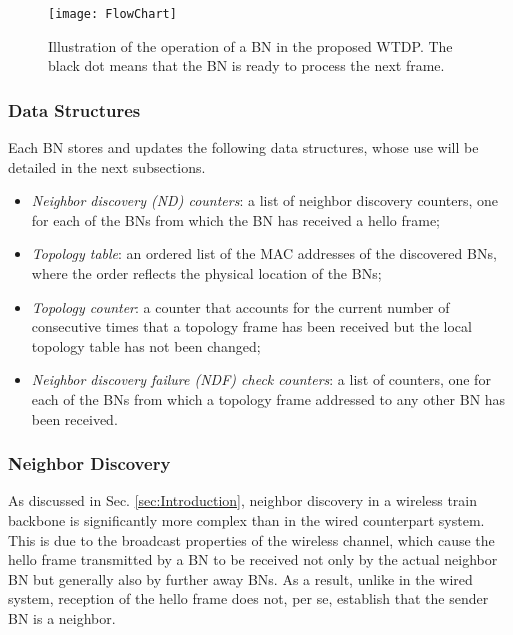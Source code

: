 \documentclass[10pt,english,two column]{IEEEtran}
\begin{document}
\begin{figure*}[tp]
\begin{centering}
\textsf{\texttt{[image: FlowChart]}}
\par\end{centering}

\caption{\label{fig:flow}Illustration of the operation of a BN in the proposed
WTDP. The black dot means that the BN is ready to process the next
frame.}
\end{figure*}



\subsubsection{Data Structures\label{sub:Data-Structures}}

Each BN stores and updates the following data structures, whose use
will be detailed in the next subsections. 
\begin{itemize}
\item \textit{Neighbor discovery (ND) counters}: a list of neighbor discovery
counters, one for each of the BNs from which the BN has received a
hello frame;
\item \textit{Topology table}: an ordered list of the MAC addresses of the
discovered BNs, where the order reflects the physical location of
the BNs;
\item \textit{Topology counter}: a counter that accounts for the current
number of consecutive times that a topology frame has been received
but the local topology table has not been changed;
\item \textit{Neighbor discovery failure (NDF) check counters}: a list of
counters, one for each of the BNs from which a topology frame addressed
to any other BN has been received.
\end{itemize}

\subsubsection{Neighbor Discovery\label{sub:Neighbor-Discovery}}

As discussed in Sec. \ref{sec:Introduction}, neighbor discovery in
a wireless train backbone is significantly more complex than in the
wired counterpart system. This is due to the broadcast properties
of the wireless channel, which cause the hello frame transmitted by
a BN to be received not only by the actual neighbor BN but generally
also by further away BNs. As a result, unlike in the wired system,
reception of the hello frame does not, per se, establish that the
sender BN is a neighbor. 
\end{document}
